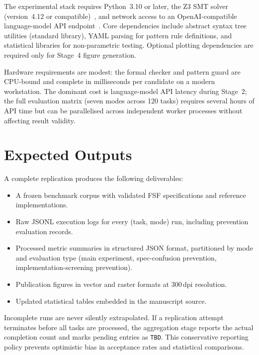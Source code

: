 The experimental stack requires Python~3.10 or later, the Z3 SMT solver
(version~4.12 or compatible)~\citep{demoura2008z3}, and network access to an OpenAI-compatible
language-model API endpoint~\citep{openai2023gpt4}.  Core dependencies include abstract syntax tree
utilities (standard library), YAML parsing for pattern rule definitions, and
statistical libraries for non-parametric testing.  Optional plotting
dependencies are required only for Stage~4 figure generation.

Hardware requirements are modest: the formal checker and pattern guard are
CPU-bound and complete in milliseconds per candidate on a modern workstation.
The dominant cost is language-model API latency during Stage~2; the full
evaluation matrix (seven modes across 120 tasks) requires several hours of
API time but can be parallelised across independent worker processes without
affecting result validity.

\section{Expected Outputs}
\label{sec:repro:outputs}

A complete replication produces the following deliverables:

\begin{itemize}
  \item A frozen benchmark corpus with validated FSF specifications and
        reference implementations.
  \item Raw JSONL execution logs for every (task, mode) run, including
        prevention evaluation records.
  \item Processed metric summaries in structured JSON format, partitioned by
        mode and evaluation type (main experiment, spec-confusion prevention,
        implementation-screening prevention).
  \item Publication figures in vector and raster formats at 300\,dpi
        resolution.
  \item Updated statistical tables embedded in the manuscript source.
\end{itemize}

Incomplete runs are never silently extrapolated.  If a replication attempt
terminates before all tasks are processed, the aggregation stage reports the
actual completion count and marks pending entries as \texttt{TBD}.  This
conservative reporting policy prevents optimistic bias in acceptance rates and
statistical comparisons.

